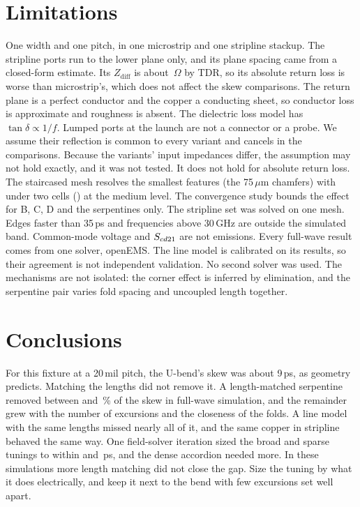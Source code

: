 \section{Limitations}
\label{sec:limitations}

One width and one pitch, in one microstrip and one stripline stackup. The stripline ports run to the lower
plane only, and its plane spacing came from a closed-form estimate. Its $Z_\mathrm{diff}$ is about
\ZmaxBsl\,$\Omega$ by TDR, so its absolute return loss is worse than microstrip's, which does not affect the
skew comparisons. The return plane is a perfect conductor and the copper a
conducting sheet, so conductor loss is approximate and roughness is absent. The dielectric loss model has
$\tan\delta \propto 1/f$. Lumped ports at the launch are not a connector or a probe. We assume their reflection is common to every variant
and cancels in the comparisons. Because the variants' input impedances differ, the assumption may not hold exactly, and it was not tested. It does not
hold for absolute return loss. The staircased mesh resolves the
smallest features (the 75\,$\mu$m chamfers) with under two cells (\ChamferCellsMedium) at the medium level. The convergence study bounds the effect for B, C, D and the serpentines only. The stripline set was solved on
one mesh. Edges faster than 35\,ps and frequencies above 30\,GHz are outside the
simulated band. Common-mode voltage and $S_{cd21}$ are not emissions. Every full-wave result comes from one solver, openEMS. The line model is calibrated on its results, so their agreement is not independent validation. No second solver
was used. The mechanisms are not isolated: the corner effect is inferred by elimination, and the serpentine pair
varies fold spacing and uncoupled length together.

\section{Conclusions}

For this fixture at a 20\,mil pitch, the U-bend's skew was about 9\,ps, as geometry predicts. Matching the lengths
did not remove it. A length-matched serpentine removed between \RemovedPctD{} and \RemovedPctF\,\% of the skew in full-wave
simulation, and the
remainder grew with the number of excursions and the closeness of the folds. A line model with the same lengths
missed nearly all of it, and the same copper in stripline behaved the same way. One field-solver iteration sized
the broad and sparse tunings to within \SkewFcal{} and \SkewCcal\,ps, and the dense accordion needed more. In these simulations more length matching did
not close the gap. Size the tuning by what it does electrically, and keep it next to the bend with few excursions set
well apart.

